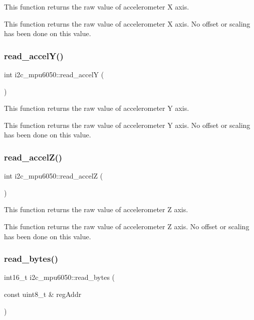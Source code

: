 This function returns the raw value of accelerometer X axis. 

This function returns the raw value of accelerometer X axis. No offset or scaling has been done on this value. \mbox{\label{classi2c__mpu6050_abe18e2ba5e0ceefa9462efbd46de4129}} 
\subsubsection{\texorpdfstring{read\+\_\+accel\+Y()}{read\_accelY()}}
{\footnotesize\ttfamily int i2c\+\_\+mpu6050\+::read\+\_\+accelY (\begin{DoxyParamCaption}{ }\end{DoxyParamCaption})}



This function returns the raw value of accelerometer Y axis. 

This function returns the raw value of accelerometer Y axis. No offset or scaling has been done on this value. \mbox{\label{classi2c__mpu6050_ab338d829847b1ffbeaddad82e56bb80e}} 
\subsubsection{\texorpdfstring{read\+\_\+accel\+Z()}{read\_accelZ()}}
{\footnotesize\ttfamily int i2c\+\_\+mpu6050\+::read\+\_\+accelZ (\begin{DoxyParamCaption}{ }\end{DoxyParamCaption})}



This function returns the raw value of accelerometer Z axis. 

This function returns the raw value of accelerometer Z axis. No offset or scaling has been done on this value. \mbox{\label{classi2c__mpu6050_ade55e40b4285d8a2212e88175e8b0b10}} 
\subsubsection{\texorpdfstring{read\+\_\+bytes()}{read\_bytes()}}
{\footnotesize\ttfamily int16\+\_\+t i2c\+\_\+mpu6050\+::read\+\_\+bytes (\begin{DoxyParamCaption}\item[{const uint8\+\_\+t \&}]{reg\+Addr }\end{DoxyParamCaption})}



